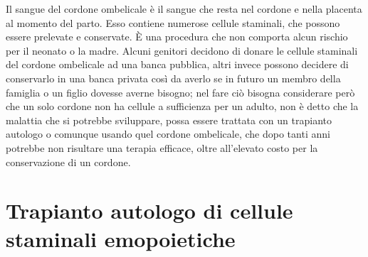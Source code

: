 Il sangue del cordone ombelicale è il sangue che resta nel cordone e nella placenta al momento del parto. 
Esso contiene numerose cellule staminali, che possono essere prelevate e conservate. 
È una procedura che non comporta alcun rischio per il neonato o la madre. 
Alcuni genitori decidono di donare le cellule staminali del cordone ombelicale ad una banca pubblica, altri invece 
possono decidere di conservarlo in una banca privata così da averlo se in futuro un membro della famiglia o un figlio 
dovesse averne bisogno; nel fare ciò bisogna considerare però che un solo cordone non ha cellule a sufficienza per un 
adulto, non è detto che la malattia che si potrebbe sviluppare, possa essere trattata con un trapianto autologo o 
comunque usando quel cordone ombelicale, che dopo tanti anni potrebbe non risultare una terapia efficace, oltre 
all’elevato costo per la conservazione di un cordone\cite{STEMCELLS}.

\section{Trapianto autologo di cellule staminali emopoietiche}

